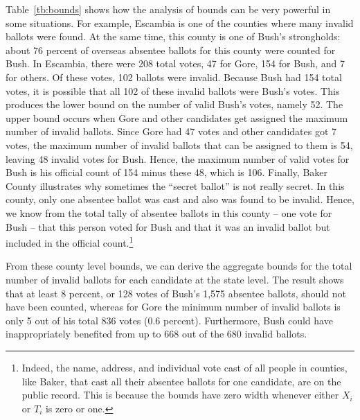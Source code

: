 \documentclass[11pt,titlepage]{article}
\begin{document}
Table~\ref{tb:bounds} shows how the analysis of bounds can be very
powerful in some situations. For example, Escambia is one of the
counties where many invalid ballots were found. At the same time, this
county is one of Bush's strongholds: about 76 percent of overseas
absentee ballots for this county were counted for Bush. In Escambia,
there were 208 total votes, 47 for Gore, 154 for Bush, and 7 for
others. Of these votes, 102 ballots were invalid. Because Bush had 154
total votes, it is possible that all 102 of these invalid ballots were
Bush's votes. This produces the lower bound on the number of valid
Bush's votes, namely 52.  The upper bound occurs when Gore and other
candidates get assigned the maximum number of invalid ballots. Since
Gore had 47 votes and other candidates got 7 votes, the maximum number
of invalid ballots that can be assigned to them is 54, leaving 48
invalid votes for Bush. Hence, the maximum number of valid votes for
Bush is his official count of 154 minus these 48, which is 106.
Finally, Baker County illustrates why sometimes the ``secret ballot''
is not really secret.  In this county, only one absentee ballot was
cast and also was found to be invalid. Hence, we know from the total
tally of absentee ballots in this county -- one vote for Bush -- that
this person voted for Bush and that it was an invalid ballot but
included in the official count.\footnote{Indeed, the name, address,
  and individual vote cast of all people in counties, like Baker, that
  cast all their absentee ballots for one candidate, are on the public
  record.  This is because the bounds have zero width whenever either
  $X_i$ or $T_i$ is zero or one.}


From these county level bounds, we can derive the aggregate bounds for
the total number of invalid ballots for each candidate at the state
level. The result shows that at least 8 percent, or 128 votes of
Bush's 1,575 absentee ballots, should not have been counted, whereas
for Gore the minimum number of invalid ballots is only 5 out of his
total 836 votes (0.6 percent).  Furthermore, Bush could have
inappropriately benefited from up to 668 out of the 680 invalid
ballots.
\end{document}
